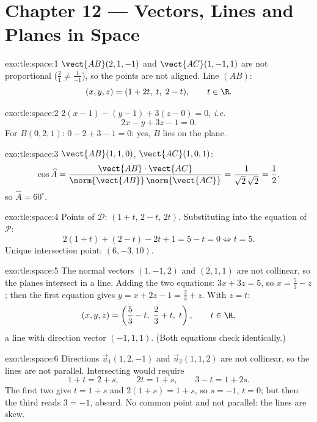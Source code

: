 \section*{Chapter 12 --- Vectors, Lines and Planes in Space}

\begin{solution}{exo:tle:space:1}
$\vect{AB}(2, 1, -1)$ and $\vect{AC}(1, -1, 1)$ are not proportional
($\frac21 \neq \frac{1}{-1}$), so the points are not aligned. Line $(AB)$:
\[
(x, y, z) = (1 + 2t,\; t,\; 2 - t), \qquad t \in \R .
\]
\end{solution}

\begin{solution}{exo:tle:space:2}
$2(x - 1) - (y - 1) + 3(z - 0) = 0$, \emph{i.e.}
\[
2x - y + 3z - 1 = 0 .
\]
For $B(0,2,1)$: $0 - 2 + 3 - 1 = 0$: yes, $B$ lies on the plane.
\end{solution}

\begin{solution}{exo:tle:space:3}
$\vect{AB}(1,1,0)$, $\vect{AC}(1,0,1)$:
\[
\cos\widehat{A}
= \frac{\vect{AB}\cdot\vect{AC}}{\norm{\vect{AB}}\,\norm{\vect{AC}}}
= \frac{1}{\sqrt2\,\sqrt2} = \frac12,
\]
so $\widehat A = 60^\circ$.
\end{solution}

\begin{solution}{exo:tle:space:4}
Points of $\mathcal D$: $(1 + t,\, 2 - t,\, 2t)$. Substituting into the
equation of $\mathcal P$:
\[
2(1+t) + (2 - t) - 2t + 1 = 5 - t = 0 \iff t = 5 .
\]
Unique intersection point: $(6, -3, 10)$.
\end{solution}

\begin{solution}{exo:tle:space:5}
The normal vectors $(1, -1, 2)$ and $(2, 1, 1)$ are not collinear, so the
planes intersect in a line. Adding the two equations: $3x + 3z = 5$, so
$x = \frac53 - z$; then the first equation gives
$y = x + 2z - 1 = \frac23 + z$. With $z = t$:
\[
(x, y, z) = \left(\frac53 - t,\; \frac23 + t,\; t\right), \qquad t \in \R,
\]
a line with direction vector $(-1, 1, 1)$. (Both equations check
identically.)
\end{solution}

\begin{solution}{exo:tle:space:6}
Directions $\vec u_1(1, 2, -1)$ and $\vec u_2(1, 1, 2)$ are not collinear,
so the lines are not parallel. Intersecting would require
\[
1 + t = 2 + s, \qquad 2t = 1 + s, \qquad 3 - t = 1 + 2s .
\]
The first two give $t = 1 + s$ and $2(1+s) = 1 + s$, so $s = -1$, $t = 0$;
but then the third reads $3 = -1$, absurd. No common point and not
parallel: the lines are skew.
\end{solution}

